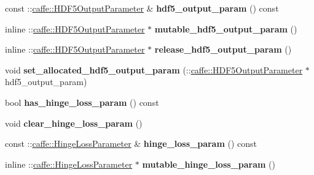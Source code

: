 \begin{DoxyCompactItemize}
const \+::\mbox{\hyperlink{classcaffe_1_1_h_d_f5_output_parameter}{caffe\+::\+H\+D\+F5\+Output\+Parameter}} \& {\bfseries hdf5\+\_\+output\+\_\+param} () const
\item 
\mbox{\label{classcaffe_1_1_v1_layer_parameter_ae1f643a25eb8eb836af47e6ff8570f5e}} 
inline \+::\mbox{\hyperlink{classcaffe_1_1_h_d_f5_output_parameter}{caffe\+::\+H\+D\+F5\+Output\+Parameter}} $\ast$ {\bfseries mutable\+\_\+hdf5\+\_\+output\+\_\+param} ()
\item 
\mbox{\label{classcaffe_1_1_v1_layer_parameter_adcf41931ef07def9caffe081c0498738}} 
inline \+::\mbox{\hyperlink{classcaffe_1_1_h_d_f5_output_parameter}{caffe\+::\+H\+D\+F5\+Output\+Parameter}} $\ast$ {\bfseries release\+\_\+hdf5\+\_\+output\+\_\+param} ()
\item 
\mbox{\label{classcaffe_1_1_v1_layer_parameter_afbdf19e8968fd7f05c21d4a07ab0b507}} 
void {\bfseries set\+\_\+allocated\+\_\+hdf5\+\_\+output\+\_\+param} (\+::\mbox{\hyperlink{classcaffe_1_1_h_d_f5_output_parameter}{caffe\+::\+H\+D\+F5\+Output\+Parameter}} $\ast$hdf5\+\_\+output\+\_\+param)
\item 
\mbox{\label{classcaffe_1_1_v1_layer_parameter_a8c02c39eef17c78b8f4288fe633eeca4}} 
bool {\bfseries has\+\_\+hinge\+\_\+loss\+\_\+param} () const
\item 
\mbox{\label{classcaffe_1_1_v1_layer_parameter_a6a83ecc6312de41cf4e241b7c6a67c86}} 
void {\bfseries clear\+\_\+hinge\+\_\+loss\+\_\+param} ()
\item 
\mbox{\label{classcaffe_1_1_v1_layer_parameter_a37195e5b83bb259570c14ccc5edf289f}} 
const \+::\mbox{\hyperlink{classcaffe_1_1_hinge_loss_parameter}{caffe\+::\+Hinge\+Loss\+Parameter}} \& {\bfseries hinge\+\_\+loss\+\_\+param} () const
\item 
\mbox{\label{classcaffe_1_1_v1_layer_parameter_afcfa7bbc57c9b6150b06ee5000cca1af}} 
inline \+::\mbox{\hyperlink{classcaffe_1_1_hinge_loss_parameter}{caffe\+::\+Hinge\+Loss\+Parameter}} $\ast$ {\bfseries mutable\+\_\+hinge\+\_\+loss\+\_\+param} ()

\end{DoxyCompactItemize}
